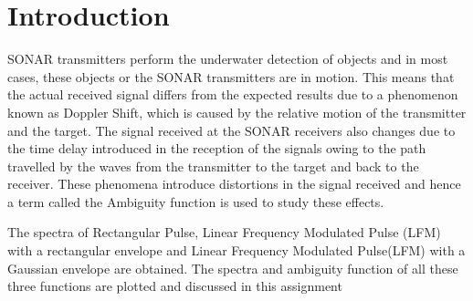  \chapter*{Introduction}

\noindent SONAR transmitters perform the underwater detection of objects and in most cases, these objects or the SONAR transmitters are in motion. This means that the actual received signal differs from the expected results due to a phenomenon known as Doppler Shift, which is caused by the relative motion of the transmitter and the target. The signal received at the SONAR receivers also changes due to the time delay introduced in the reception of the signals owing to the path travelled by the waves from the transmitter to the target and back to the receiver. These phenomena introduce distortions in the signal received and hence a term called the Ambiguity function is used to study these effects.

\noindent The spectra of Rectangular Pulse, Linear Frequency Modulated Pulse (LFM) with a rectangular envelope and Linear Frequency Modulated Pulse(LFM) with a Gaussian envelope are obtained. The spectra and ambiguity function of all these three functions are plotted and discussed in this assignment



